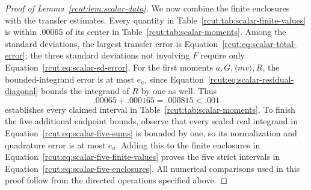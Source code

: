 \begin{proof}[Proof of Lemma~\ref{rcut:lem:scalar-data}]
We now combine the finite enclosures with the transfer estimates.
Every quantity in Table~\ref{rcut:tab:scalar-finite-values} is within
\(.00065\) of its center in Table~\ref{rcut:tab:scalar-moments}.
Among the standard deviations, the largest transfer error is
Equation~\eqref{rcut:eq:scalar-total-error}; the three standard deviations
not involving \(F\) require only
Equation~\eqref{rcut:eq:scalar-sd-error}. For the first moments
\(a,G,\langle mv\rangle,R\), the bounded-integrand error is at most
\(e_a\), since Equation~\eqref{rcut:eq:scalar-residual-diagonal} bounds
the integrand of \(R\) by one as well. Thus
\[
 .00065+.000165=.000815<.001
\]
establishes every claimed interval in
Table~\ref{rcut:tab:scalar-moments}.
To finish the five additional endpoint bounds, observe that every
scaled real integrand in
Equation~\eqref{rcut:eq:scalar-five-sums} is bounded by one, so its
normalization and quadrature error is at most \(e_a\).
Adding this to the finite enclosures in
Equation~\eqref{rcut:eq:scalar-five-finite-values} proves the five strict
intervals in Equation~\eqref{rcut:eq:scalar-five-enclosures}.
All numerical comparisons used in this proof follow from the
directed operations specified above.
\end{proof}
